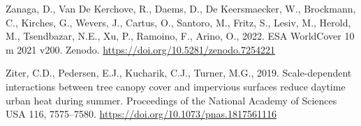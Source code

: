 \documentclass[preprint,12pt,authoryear]{elsarticle}
\begin{document}
\begin{thebibliography}{}
Zanaga, D., Van De Kerchove, R., Daems, D., De Keersmaecker, W.,
Brockmann, C., Kirches, G., Wevers, J., Cartus, O., Santoro, M.,
Fritz, S., Lesiv, M., Herold, M., Tsendbazar, N.E., Xu, P., Ramoino, F.,
Arino, O., 2022. ESA WorldCover 10 m 2021 v200. Zenodo.
\url{https://doi.org/10.5281/zenodo.7254221}

Ziter, C.D., Pedersen, E.J., Kucharik, C.J., Turner, M.G., 2019.
Scale-dependent interactions between tree canopy cover and impervious
surfaces reduce daytime urban heat during summer. Proceedings of the
National Academy of Sciences USA 116, 7575--7580.
\url{https://doi.org/10.1073/pnas.1817561116}

\end{thebibliography}
\end{document}
